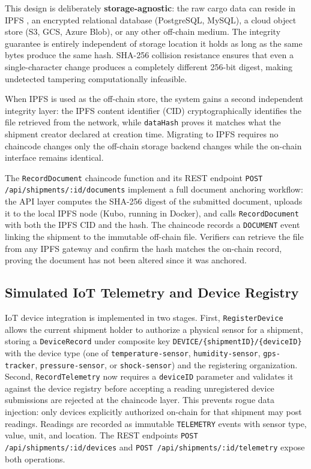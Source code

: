 \documentclass[conference]{IEEEtran}
\begin{document}
This design is deliberately \textbf{storage-agnostic}: the raw cargo data
can reside in IPFS \cite{ipfs}, an encrypted relational database (PostgreSQL,
MySQL), a cloud object store (S3, GCS, Azure Blob), or any other off-chain
medium.  The integrity guarantee is entirely independent of storage location
 it holds as long as the same bytes produce the same hash.  SHA-256
collision resistance ensures that even a single-character change produces a
completely different 256-bit digest, making undetected tampering
computationally infeasible.

When IPFS is used as the off-chain store, the system gains a second
independent integrity layer: the IPFS content identifier (CID) cryptographically
identifies the file retrieved from the network, while \texttt{dataHash}
proves it matches what the shipment creator declared at creation time.
Migrating to IPFS requires no chaincode changes  only the off-chain
storage backend changes while the on-chain interface remains identical.

The \texttt{RecordDocument} chaincode function and its REST endpoint
\texttt{POST /api/shipments/:id/documents} implement a full document
anchoring workflow: the API layer computes the SHA-256 digest of the
submitted document, uploads it to the local IPFS node (Kubo, running in
Docker), and calls \texttt{RecordDocument} with both the IPFS CID and the
hash.  The chaincode records a \texttt{DOCUMENT} event linking the shipment
to the immutable off-chain file.  Verifiers can retrieve the file from any
IPFS gateway and confirm the hash matches the on-chain record, proving
the document has not been altered since it was anchored.

\subsection{Simulated IoT Telemetry and Device Registry}
\label{sec:iot}

IoT device integration is implemented in two stages.  First,
\texttt{RegisterDevice} allows the current shipment holder to authorize
a physical sensor for a shipment, storing a \texttt{DeviceRecord} under
composite key \texttt{DEVICE/\{shipmentID\}/\{deviceID\}} with the device
type (one of \texttt{temperature-sensor}, \texttt{humidity-sensor},
\texttt{gps-tracker}, \texttt{pressure-sensor}, or \texttt{shock-sensor})
and the registering organization.  Second, \texttt{RecordTelemetry} now
requires a \texttt{deviceID} parameter and validates it against the
device registry before accepting a reading  unregistered device
submissions are rejected at the chaincode layer.  This prevents rogue
data injection: only devices explicitly authorized on-chain for that
shipment may post readings.  Readings are recorded as immutable
\texttt{TELEMETRY} events with sensor type, value, unit, and location.
The REST endpoints \texttt{POST /api/shipments/:id/devices} and
\texttt{POST /api/shipments/:id/telemetry} expose both operations.
\end{document}
